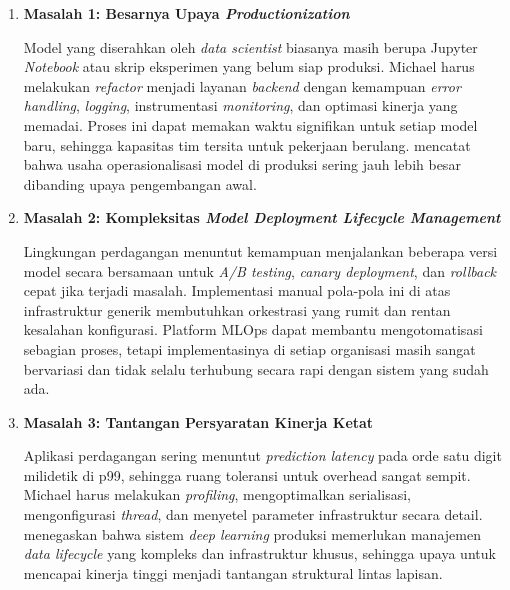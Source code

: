 \begin{enumerate}
    \vspace{0.5em}
    \begin{enumerate}[label=\alph*)]
        \item \textbf{Masalah 1: Besarnya Upaya \textit{Productionization}}
        
        Model yang diserahkan oleh \textit{data scientist} biasanya masih berupa Jupyter \textit{Notebook} atau skrip eksperimen yang belum siap produksi. Michael harus melakukan \textit{refactor} menjadi layanan \textit{backend} dengan kemampuan \textit{error handling}, \textit{logging}, instrumentasi \textit{monitoring}, dan optimasi kinerja yang memadai. Proses ini dapat memakan waktu signifikan untuk setiap model baru, sehingga kapasitas tim tersita untuk pekerjaan berulang. \textcite{paleyes2022challenges} mencatat bahwa usaha operasionalisasi model di produksi sering jauh lebih besar dibanding upaya pengembangan awal.

        \vspace{0.5em}

        \item \textbf{Masalah 2: Kompleksitas \textit{Model Deployment Lifecycle Management}}
        
        Lingkungan perdagangan menuntut kemampuan menjalankan beberapa versi model secara bersamaan untuk \textit{A/B testing}, \textit{canary deployment}, dan \textit{rollback} cepat jika terjadi masalah. Implementasi manual pola-pola ini di atas infrastruktur generik membutuhkan orkestrasi yang rumit dan rentan kesalahan konfigurasi. Platform MLOps dapat membantu mengotomatisasi sebagian proses, tetapi implementasinya di setiap organisasi masih sangat bervariasi dan tidak selalu terhubung secara rapi dengan sistem yang sudah ada.

        \vspace{0.5em}

        \item \textbf{Masalah 3: Tantangan Persyaratan Kinerja Ketat}
        
        Aplikasi perdagangan sering menuntut \textit{prediction latency} pada orde satu digit milidetik di p99, sehingga ruang toleransi untuk overhead sangat sempit. Michael harus melakukan \textit{profiling}, mengoptimalkan serialisasi, mengonfigurasi \textit{thread}, dan menyetel parameter infrastruktur secara detail. \textcite{munappy2022data} menegaskan bahwa sistem \textit{deep learning} produksi memerlukan manajemen \textit{data lifecycle} yang kompleks dan infrastruktur khusus, sehingga upaya untuk mencapai kinerja tinggi menjadi tantangan struktural lintas lapisan.


\end{enumerate}
\end{enumerate}
